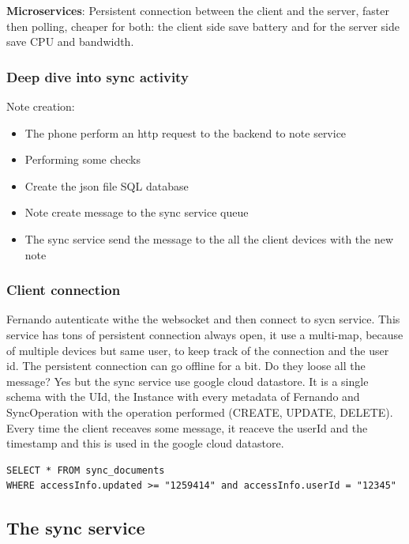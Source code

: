 \textbf{Microservices}: Persistent connection between the client and the server, faster
then polling, cheaper for both:  the client side save battery and for
the server side save CPU and bandwidth.


\subsubsection{Deep dive into sync activity}

Note creation:


\begin{itemize}
  \item The phone perform an http request to the backend to note service
  \item Performing some checks
  \item Create the json file SQL database
  \item Note create message to the sync service queue
  \item The sync service send the message to the all the client devices with the new note
\end{itemize}



\subsubsection{Client connection}
Fernando autenticate withe the websocket and then connect to sycn service.
This service has tons of persistent connection always open, it use a
multi-map, because of multiple devices but same user, to keep track of
the connection and the user id.
The persistent connection can go offline for a bit. Do they loose all the
message? Yes but the sync service use google cloud datastore.
It is a single schema with the UId, the Instance with every metadata of
Fernando and SyncOperation with the operation performed (CREATE, UPDATE, DELETE).
Every time the client receaves some message, it reaceve the userId and
the timestamp and this is used in the google cloud datastore.

\begin{verbatim}
SELECT * FROM sync_documents
WHERE accessInfo.updated >= "1259414" and accessInfo.userId = "12345"

\end{verbatim}

\subsection{The sync service}

